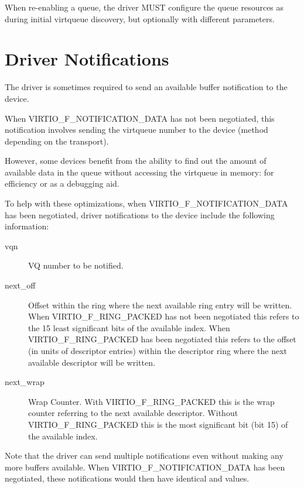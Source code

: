 When re-enabling a queue, the driver MUST configure the queue resources
as during initial virtqueue discovery, but optionally with different
parameters.





\section{Driver Notifications} \label{sec:Virtqueues / Driver notifications}
The driver is sometimes required to send an available buffer
notification to the device.

When VIRTIO_F_NOTIFICATION_DATA has not been negotiated,
this notification involves sending the
virtqueue number to the device (method depending on the transport).

However, some devices benefit from the ability to find out the
amount of available data in the queue without accessing the virtqueue in memory:
for efficiency or as a debugging aid.

To help with these optimizations, when VIRTIO_F_NOTIFICATION_DATA
has been negotiated, driver notifications to the device include
the following information:

\begin{description}
\item [vqn] VQ number to be notified.
\item [next_off] Offset
      within the ring where the next available ring entry
      will be written.
      When VIRTIO_F_RING_PACKED has not been negotiated this refers to the
      15 least significant bits of the available index.
      When VIRTIO_F_RING_PACKED has been negotiated this refers to the offset
      (in units of descriptor entries)
      within the descriptor ring where the next available
      descriptor will be written.
\item [next_wrap] Wrap Counter.
      With VIRTIO_F_RING_PACKED this is the wrap counter
      referring to the next available descriptor.
      Without VIRTIO_F_RING_PACKED this is the most significant bit
      (bit 15) of the available index.
\end{description}

Note that the driver can send multiple notifications even without
making any more buffers available. When VIRTIO_F_NOTIFICATION_DATA
has been negotiated, these notifications would then have
identical  and  values.

